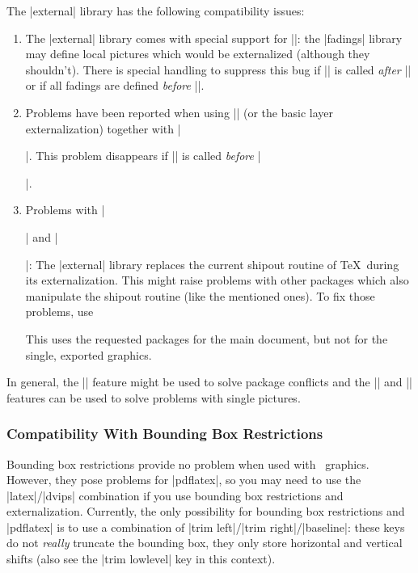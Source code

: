 The |external| library has the following compatibility issues:
%
\begin{enumerate}
    \item The |external| library comes with special support for
        |\usetikzlibrary{fadings}|: the |fadings| library may define local
        pictures which would be externalized (although they shouldn't). There
        is special handling to suppress this bug if |\tikzexternalize| is
        called \emph{after} |\usetikzlibrary{fadings}| or if all fadings are
        defined \emph{before} |\tikzexternalize|.
    \item Problems have been reported when using |\tikzexternalize| (or the
        basic layer externalization) together with |\usepackage{glossary}|.
        This problem disappears if |\tikzexternalize| is called \emph{before}
        |\usepackage{glossary}|.
    \item Problems with |\usepackage{pdfpages}| and |\usepackage{vmargin}|: The
        |external| library replaces the current shipout routine of \TeX\ during
        its externalization. This might raise problems with other packages
        which also manipulate the shipout routine (like the mentioned ones). To
        fix those problems, use
\begin{codeexample}

\usetikzlibrary{external}

%
\end{codeexample}
        This uses the requested packages for the main document, but not for the
        single, exported graphics.
\end{enumerate}

In general, the |\tikzifexternalizing| feature might be used to solve package
conflicts and the |\tikzexternaldisable| and |\tikzexternalenable| features can
be used to solve problems with single pictures.


\subsubsection{Compatibility With Bounding Box Restrictions}

Bounding box restrictions provide no problem when used with \eps\ graphics.
However, they pose problems for |pdflatex|, so you may need to use the
|latex|/|dvips| combination if you use bounding box restrictions and
externalization. Currently, the only possibility for bounding box restrictions
and |pdflatex| is to use a combination of |trim left|/|trim right|/|baseline|:
these keys do not \emph{really} truncate the bounding box, they only store
horizontal and vertical shifts (also see the |trim lowlevel| key in this
context).


